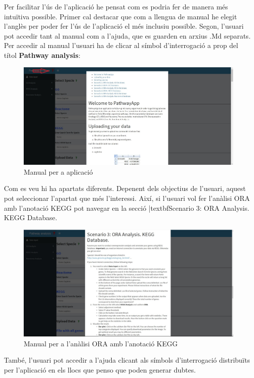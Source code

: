 Per facilitar l'ús de l’aplicació he pensat com es podria fer de manera més intuïtiva possible. Primer cal destacar que com a llengua de manual he elegit l’anglès per poder fer l'ús de l'aplicació el més inclusiu possible. Segon, l'usuari pot accedir tant al manual com a l'ajuda, que es guarden en arxius .Md separats. Per accedir al manual l'usuari ha de clicar al símbol d’interrogació a prop del títol \textbf{Pathway analysis}:
\begin{figure}[H]
\centering
\includegraphics[width=1\textwidth]{figures/Manual.jpg} 
\caption{Manual per a aplicació}
\end{figure}

Com es veu hi ha apartats diferents. Depenent dels objectius de l'usuari, aquest pot seleccionar l'apartat que més l'interessi. Així, si l'usuari vol fer l'anàlisi ORA amb l'anotació KEGG pot navegar en la secció |textbf{Scenario 3: ORA Analysis. KEGG Database}. 

\begin{figure}[H]
\centering
\includegraphics[width=1\textwidth]{figures/Manual2.jpg} 
\caption{Manual per a l'anàlisi ORA amb l'anotació KEGG}
\end{figure}


També, l'usuari pot accedir a l'ajuda clicant als símbols d'interrogació distribuïts per l’aplicació en els llocs que penso que poden generar dubtes. 

